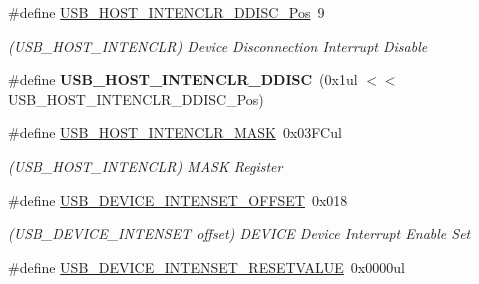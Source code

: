\begin{DoxyCompactItemize}
\item 
\hypertarget{group___s_a_m_l21___u_s_b_gac71d14dd438e3ffeac3f064b2935a17c}{}\#define \hyperlink{group___s_a_m_l21___u_s_b_gac71d14dd438e3ffeac3f064b2935a17c}{U\+S\+B\+\_\+\+H\+O\+S\+T\+\_\+\+I\+N\+T\+E\+N\+C\+L\+R\+\_\+\+D\+D\+I\+S\+C\+\_\+\+Pos}~9\label{group___s_a_m_l21___u_s_b_gac71d14dd438e3ffeac3f064b2935a17c}

\begin{DoxyCompactList}\small\item\em (U\+S\+B\+\_\+\+H\+O\+S\+T\+\_\+\+I\+N\+T\+E\+N\+C\+L\+R) Device Disconnection Interrupt Disable \end{DoxyCompactList}\item 
\hypertarget{group___s_a_m_l21___u_s_b_ga59288373e48c544f456dc07114151715}{}\#define {\bfseries U\+S\+B\+\_\+\+H\+O\+S\+T\+\_\+\+I\+N\+T\+E\+N\+C\+L\+R\+\_\+\+D\+D\+I\+S\+C}~(0x1ul $<$$<$ U\+S\+B\+\_\+\+H\+O\+S\+T\+\_\+\+I\+N\+T\+E\+N\+C\+L\+R\+\_\+\+D\+D\+I\+S\+C\+\_\+\+Pos)\label{group___s_a_m_l21___u_s_b_ga59288373e48c544f456dc07114151715}

\item 
\hypertarget{group___s_a_m_l21___u_s_b_gac81bab6a534ae1535f534d175a170c4a}{}\#define \hyperlink{group___s_a_m_l21___u_s_b_gac81bab6a534ae1535f534d175a170c4a}{U\+S\+B\+\_\+\+H\+O\+S\+T\+\_\+\+I\+N\+T\+E\+N\+C\+L\+R\+\_\+\+M\+A\+S\+K}~0x03\+F\+Cul\label{group___s_a_m_l21___u_s_b_gac81bab6a534ae1535f534d175a170c4a}

\begin{DoxyCompactList}\small\item\em (U\+S\+B\+\_\+\+H\+O\+S\+T\+\_\+\+I\+N\+T\+E\+N\+C\+L\+R) M\+A\+S\+K Register \end{DoxyCompactList}\item 
\hypertarget{group___s_a_m_l21___u_s_b_gae59bbfd7794869cb47dbc44ab07c8492}{}\#define \hyperlink{group___s_a_m_l21___u_s_b_gae59bbfd7794869cb47dbc44ab07c8492}{U\+S\+B\+\_\+\+D\+E\+V\+I\+C\+E\+\_\+\+I\+N\+T\+E\+N\+S\+E\+T\+\_\+\+O\+F\+F\+S\+E\+T}~0x018\label{group___s_a_m_l21___u_s_b_gae59bbfd7794869cb47dbc44ab07c8492}

\begin{DoxyCompactList}\small\item\em (U\+S\+B\+\_\+\+D\+E\+V\+I\+C\+E\+\_\+\+I\+N\+T\+E\+N\+S\+E\+T offset) D\+E\+V\+I\+C\+E Device Interrupt Enable Set \end{DoxyCompactList}\item 
\hypertarget{group___s_a_m_l21___u_s_b_gaf95223cc63f60aa537d65f85629d3f01}{}\#define \hyperlink{group___s_a_m_l21___u_s_b_gaf95223cc63f60aa537d65f85629d3f01}{U\+S\+B\+\_\+\+D\+E\+V\+I\+C\+E\+\_\+\+I\+N\+T\+E\+N\+S\+E\+T\+\_\+\+R\+E\+S\+E\+T\+V\+A\+L\+U\+E}~0x0000ul\label{group___s_a_m_l21___u_s_b_gaf95223cc63f60aa537d65f85629d3f01}


\end{DoxyCompactItemize}
